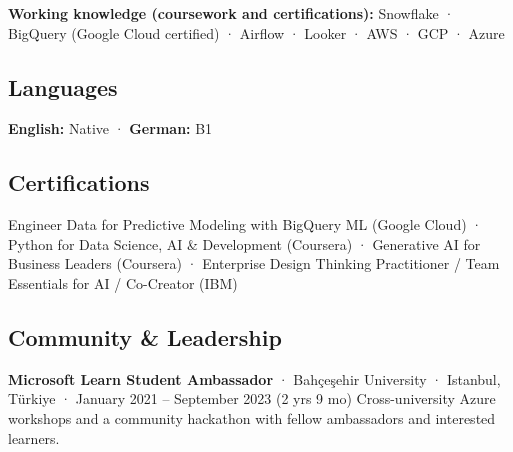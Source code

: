 \documentclass[
  10pt,
]{article}
\begin{document}
\textbf{Working knowledge (coursework and certifications):} Snowflake ·
BigQuery (Google Cloud certified) · Airflow · Looker · AWS · GCP · Azure

\subsection{Languages}\label{languages}

\textbf{English:} Native · \textbf{German:} B1

\subsection{Certifications}\label{certifications}

Engineer Data for Predictive Modeling with BigQuery ML (Google Cloud) ·
Python for Data Science, AI \& Development (Coursera) · Generative AI
for Business Leaders (Coursera) · Enterprise Design Thinking
Practitioner / Team Essentials for AI / Co-Creator (IBM)

\subsection{Community \& Leadership}\label{community-leadership}

\textbf{Microsoft Learn Student Ambassador} · Bahçeşehir University ·
Istanbul, Türkiye · January 2021 -- September 2023 (2 yrs 9 mo)
Cross-university Azure workshops and a community hackathon with fellow
ambassadors and interested learners.
\end{document}
